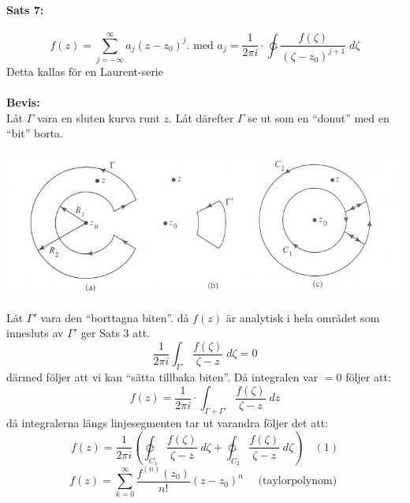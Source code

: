 \paragraph{Sats 7:}
\[
	f(z) = \sum_{j = - \infty}^\infty a_j (z - z_0)^j. \text{ med } a_j = \frac {1} {2 \pi i} \cdot \ointctrclockwise
		\frac {f(\zeta)} {(\zeta - z_0)^{j + 1}} \; d\zeta
\]
Detta kallas för en Laurent-serie\\
\\
{\bf Bevis:}\\
Låt $\Gamma$ vara en sluten kurva runt $z$.
Låt därefter $\Gamma$ se ut som en ``donut'' med en ``bit'' borta.
\begin{center}
	\includegraphics[scale=0.5]{aoeu.jpg}
\end{center}
Låt $\Gamma'$ vara den ``borttagna biten''. då $f(z)$ är analytisk i hela området som innesluts av $\Gamma'$ ger Sats 3 att.
\[
	\frac {1} {2 \pi i} \int_{\Gamma'} \frac {f(\zeta)} {\zeta - z} \; d\zeta = 0
\]
därmed följer att vi kan ``sätta tillbaka biten''. Då integralen var $= 0$ följer att:
\[
	f(z) = \frac {1} {2 \pi i} \cdot \int_{\Gamma + \Gamma'} \frac {f(\zeta)} {\zeta - z} \; dz
\]
då integralerna längs linjesegmenten tar ut varandra följer det att:
\[
	f(z) = \frac {1} {2 \pi i} \left ( \varointclockwise_{C_1} \frac {f(\zeta)} {\zeta - z} \; d\zeta + 
		\ointctrclockwise_{C_2} \frac {f(\zeta)} {\zeta - z} \; d\zeta \right ) \quad (1)
\]
\[
	f(z) = \sum_{k = 0}^\infty \frac {f^{(n)}(z_0)} {n!} (z - z_0)^n \quad \text{ (taylorpolynom) }
\]

